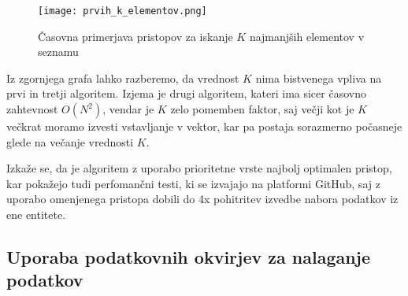 \documentclass[a4paper,12pt,openright]{book}
\begin{document}
        \begin{figure}[H]
            \centerline{\texttt{[image: prvih\_k\_elementov.png]}}
            \caption{Časovna primerjava pristopov za iskanje $K$ najmanjših elementov v seznamu}
            \label{sl:k_smallest}
        \end{figure}

        \noindent
        Iz zgornjega grafa lahko razberemo, da vrednost $K$ nima bistvenega vpliva na prvi in tretji algoritem. Izjema je drugi algoritem, kateri ima sicer časovno zahtevnost $O(N^2)$, vendar je $K$ zelo pomemben faktor, saj večji kot je $K$ večkrat moramo izvesti vstavljanje v vektor, kar pa postaja sorazmerno počasneje glede na večanje vrednosti $K$.

        Izkaže se, da je algoritem z uporabo prioritetne vrste najbolj optimalen pristop, kar pokažejo tudi perfomančni testi, ki se izvajajo na platformi GitHub, saj z uporabo omenjenega pristopa dobili do 4x pohitritev izvedbe nabora podatkov iz ene entitete.

        \subsection{Uporaba podatkovnih okvirjev za nalaganje podatkov}
\end{document}
